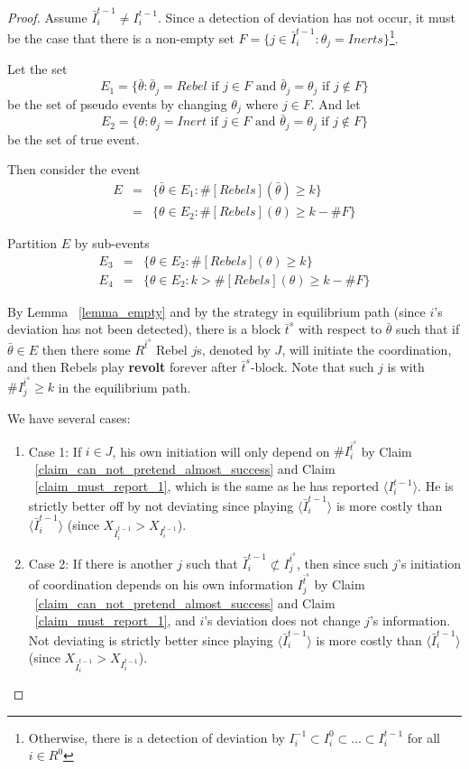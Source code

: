 \documentclass[12pt,letterpaper]{article}
\newtheorem*{main result}{Main Result}
\theoremstyle{definition}
\theoremstyle{remark}
\theoremstyle{claim}
\begin{document}
\begin{proof}
Assume $\bar{I}^{t-1}_i\neq I^{t-1}_i$. Since a detection of deviation has not occur, it must be the case that there is a non-empty set $F=\{j\in \bar{I}^{t-1}_i:\theta_j=Inerts\}$\footnote{Otherwise, there is a detection of deviation by $I^{-1}_i\subset I^{0}_i\subset...\subset I^{t-1}_i$ for all $i\in R^0$}. 


Let the set 
\[E_1=\{\bar{\theta}: \bar{\theta}_j=Rebel \text{ if } j\in F \text { and }\bar{\theta}_j=\theta_j \text{ if } j\notin F\}\]
be the set of pseudo events by changing $\theta_j$ where $j\in F$. And let
\[E_2=\{\theta: \theta_j=Inert \text{ if }j\in F \text { and }\bar{\theta}_j=\theta_j \text{ if } j\notin F\}\]
be the set of true event.

Then consider the event
\begin{eqnarray*}
E 	&= &\{\bar{\theta}\in E_1: \#[Rebels](\bar{\theta})\geq k\}\\
 	&= &\{\theta\in E_2: \#[Rebels](\theta)\geq k-\#F\}
\end{eqnarray*}

Partition $E$ by sub-events
\begin{eqnarray*}
E_3 	&= &\{\theta\in E_2: \#[Rebels](\theta)\geq k\}\\
E_4 	&= &\{\theta\in E_2: k>\#[Rebels](\theta)\geq k-\#F\}
\end{eqnarray*}

By Lemma ~\ref{lemma_empty} and by the strategy in equilibrium path (since $i$'s deviation has not been detected), there is a block $\bar{t}^{s}$ with respect to $\bar{\theta}$ such that if $\bar{\theta}\in E$ then there some $R^{\bar{t}^s}$ Rebel $j$s, denoted by $J$, will initiate the coordination, and then Rebels play \textbf{revolt} forever after $\bar{t}^s$-block. Note that such $j$ is with $\# {I}^{\bar{t}^{s}}_j \geq k$ in the equilibrium path.

We have several cases:
\begin{enumerate}
\item Case 1: If $i\in J$, his own initiation will only depend on $\# I^{\bar{t}^s}_i$ by Claim ~\ref{claim_can_not_pretend_almost_success} and Claim ~\ref{claim_must_report_1}, which is the same as he has reported $\langle {I}^{t-1}_i\rangle$. He is strictly better off by not deviating since playing $\langle\bar{I}^{t-1}_i\rangle$ is more costly than $\langle\bar{I}^{t-1}_i\rangle$ (since $X_{\bar{I}^{t-1}_i}>X_{I^{t-1}_i}$).

\item Case 2: If there is another $j$ such that $\bar{I}^{t-1}_i\not\subset I^{\bar{t}^{s}}_j$, then since such $j$'s initiation of coordination depends on his own information $I^{\bar{t}^{s}}_j$ by Claim ~\ref{claim_can_not_pretend_almost_success} and Claim ~\ref{claim_must_report_1}, and $i$'s deviation does not change $j$'s information. Not deviating is strictly better since playing $\langle\bar{I}^{t-1}_i\rangle$ is more costly than $\langle\bar{I}^{t-1}_i\rangle$ (since $X_{\bar{I}^{t-1}_i}>X_{I^{t-1}_i}$).


\end{enumerate}
\end{proof}
\end{document}
